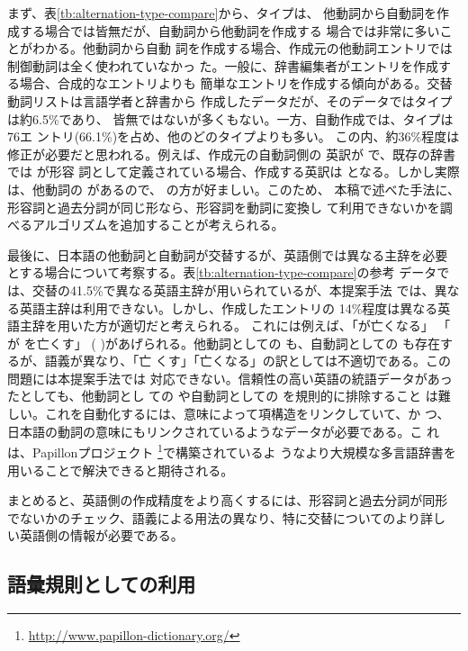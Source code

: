 \documentclass[japanese]{jnlp}
\newcommand{\eng}[1]{}
\newcommand{\iz}[1]{}
\newcommand{\abs}{}
\newcommand{\sbj}{}
\newcommand{\obj}{}
\newcommand{\tot}{}
\begin{document}
まず、表\ref{tb:alternation-type-compare}から、\iz{synthetic}タイプは、
他動詞から自動詞を作成する場合では皆無だが、自動詞から他動詞を作成する
場合では非常に多いことがわかる。他動詞から自動
詞を作成する場合、作成元の他動詞エントリでは制御動詞は全く使われていなかっ
た。一般に、辞書編集者がエントリを作成する場合、合成的なエントリよりも
簡単なエントリを作成する傾向がある。交替動詞リストは言語学者と辞書から
作成したデータだが、そのデータでは\iz{synthetic}タイプは約6.5\%であり、
皆無ではないが多くもない。一方、自動作成では、\iz{synthetic}タイプは76エ
ントリ(66.1\%)を占め、他のどのタイプよりも多い。
この内、約36\%程度は修正が必要だと思われる。例えば、作成元の自動詞側の
英訳が \eng{N1 be exhausted} で、既存の辞書では\eng{exhausted} が形容
詞として定義されている場合、作成する英訳は\eng{N1 make N2
  exhausted$_{\textnormal{adj}}$} となる。しかし実際は、他動詞の
\eng{exhaust} があるので、\eng{N1 exhaust N2} の方が好ましい。このため、
本稿で述べた手法に、形容詞と過去分詞が同じ形なら、形容詞を動詞に変換し
て利用できないかを調べるアルゴリズムを追加することが考えられる。


最後に、日本語の他動詞と自動詞が交替するが、英語側では異なる主辞を必要
とする場合について考察する。表\ref{tb:alternation-type-compare}の参考
データでは、交替の41.5\%で異なる英語主辞が用いられているが、本提案手法
では、異なる英語主辞は利用できない。しかし、作成したエントリの
14\%程度は異なる英語主辞を用いた方が適切だと考えられる。
これには例えば、「\sbj が亡くなる」  \eng{\sbj pass away} \tot  「\abs 
が \obj  を亡くす」 \eng{\abs  lose \obj} (\eng{My friend passed away}
\tot \eng{I lost my friend})があげられる。他動詞としての\eng{pass
  away} も、自動詞としての\eng{lose} も存在するが、語義が異なり、「亡
くす」「亡くなる」の訳としては不適切である。この問題には本提案手法では
対応できない。信頼性の高い英語の統語データがあったとしても、他動詞とし
ての\eng{pass away} や自動詞としての\eng{lose} を規則的に排除すること
は難しい。これを自動化するには、意味によって項構造をリンクしていて、か
つ、日本語の動詞の意味にもリンクされているようなデータが必要である。こ
れは、Papillonプロジェクト
\footnote{\url{http://www.papillon-dictionary.org/}}で構築されているよ
うなより大規模な多言語辞書を用いることで解決できると期待される。


まとめると、英語側の作成精度をより高くするには、形容詞と過去分詞が同形
でないかのチェック、語義による用法の異なり、特に交替についてのより詳し
い英語側の情報が必要である。


\subsection{語彙規則としての利用} \label{sec:lr}
\end{document}
